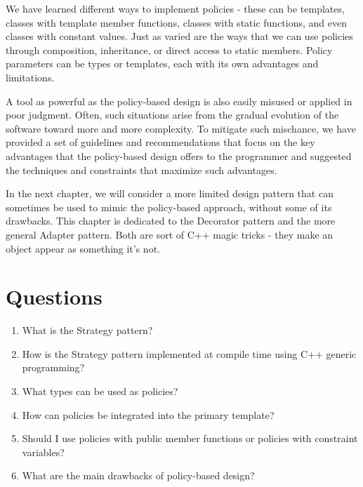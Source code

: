 We have learned different ways to implement policies - these can be templates, classes with template member functions, classes with static functions, and even classes with constant values. Just as varied are the ways that we can use policies through composition, inheritance, or direct access to static members. Policy parameters can be types or templates, each with its own advantages and limitations.

A tool as powerful as the policy-based design is also easily misused or applied in poor judgment. Often, such situations arise from the gradual evolution of the software toward more and more complexity. To mitigate such mischance, we have provided a set of guidelines and recommendations that focus on the key advantages that the policy-based design offers to the programmer and suggested the techniques and constraints that maximize such advantages.

In the next chapter, we will consider a more limited design pattern that can sometimes be used to mimic the policy-based approach, without some of its drawbacks. This chapter is dedicated to the Decorator pattern and the more general Adapter pattern. Both are sort of C++ magic tricks - they make an object appear as something it's not.

\section{Questions}

\begin{enumerate}
\item
  What is the Strategy pattern?
\item
  How is the Strategy pattern implemented at compile time using C++ generic programming?
\item
  What types can be used as policies?
\item
  How can policies be integrated into the primary template?
\item
  Should I use policies with public member functions or policies with constraint variables?
\item
  What are the main drawbacks of policy-based design?
\end{enumerate}

